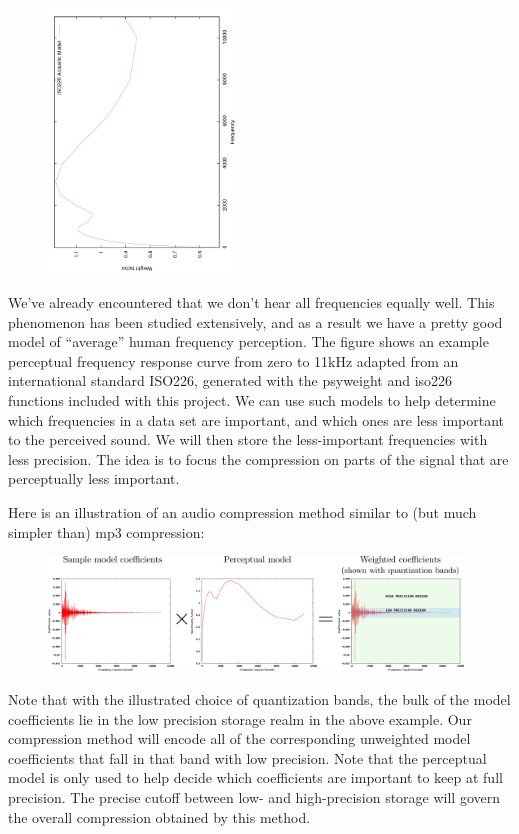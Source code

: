 \documentclass[10pt]{article}
\begin{document}
\begin{figure}
  \begin{center}
\includegraphics[angle=270,width=0.44\textwidth]{fig3}
  \end{center}
\end{figure}
We've already encountered that we don't hear all frequencies
equally well. This phenomenon has been studied extensively, and as
a result we have a pretty good model of ``average'' human frequency
perception. 
The figure shows an example perceptual
frequency response curve from zero to 11kHz 
adapted from an international standard ISO226, 
generated with the psyweight and iso226 functions included with this project. 
We can use such models to help determine which frequencies
in a data set are important, and which ones are less important to the 
perceived sound.
We will then store the less-important frequencies with less precision.
The idea is to focus the compression on parts of the signal that are
perceptually less important.

Here is an illustration of an audio compression method similar to
(but much simpler than) mp3 compression:
\begin{figure}[h!]
\begin{center}
\includegraphics[width=0.98\textwidth]{fig4}
\end{center}
\end{figure}
Note that with the illustrated choice of quantization bands, the bulk of
the model coefficients lie in the low precision storage realm in the 
above example. Our compression method will encode all of the corresponding
unweighted model coefficients that fall in that band with low precision.
Note that the perceptual model is only used to help decide which coefficients
are important to keep at full precision. The precise cutoff between low-
and high-precision storage will govern the overall compression obtained
by this method.
\end{document}
